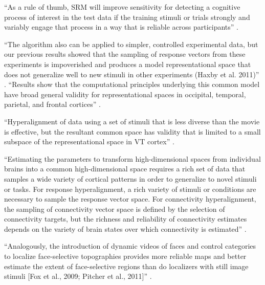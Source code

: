 

``As a rule of thumb, SRM will improve sensitivity for detecting a cognitive
process of interest in the test data if the training stimuli or trials strongly
and variably engage that process in a way that is reliable across participants''
\citep{cohen2017computational}.

%
``The algorithm also can be applied to simpler, controlled experimental data,
but our previous results showed that the sampling of response vectors from these
experiments is impoverished and produces a model representational space that
does not generalize well to new stimuli in other experiments (Haxby et al.
2011)'' \citep{guntupalli2016model}.
%
``Results show that the computational principles underlying this common
model have broad general validity for representational spaces in occipital,
temporal, parietal, and frontal cortices'' \citep{guntupalli2016model}.

``Hyperalignment of data using a set of stimuli that is less diverse than the
movie is effective, but the resultant common space has validity that is limited
to a small subspace of the representational space in VT cortex''
\citep{haxby2011common}.

%
``Estimating the parameters to transform high-dimensional spaces from individual
brains into a common high-dimensional space requires a rich set of data that
samples a wide variety of cortical patterns in order to generalize to novel
stimuli or tasks.
%
For response hyperalignment, a rich variety of stimuli or conditions are
necessary to sample the response vector space.
%
For connectivity hyperalignment, the sampling of connectivity vector space is
defined by the selection of connectivity targets, but the richness and
reliability of connectivity estimates depends on the variety of brain states
over which connectivity is estimated'' \citep{haxby2020hyperalignment}.


%
``Analogously, the introduction of dynamic videos of faces and control
categories to localize face-selective topographies provides more reliable maps
and better estimate the extent of face-selective regions than do localizers with
still image stimuli [Fox et al., 2009; Pitcher et al., 2011]''
\citep{jiahui2020predicting}.


